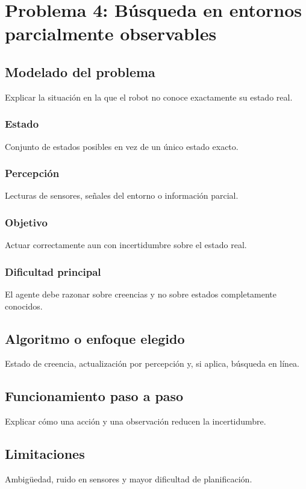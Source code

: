 \section{Problema 4: Búsqueda en entornos parcialmente observables}

\subsection{Modelado del problema}
Explicar la situación en la que el robot no conoce exactamente su estado real.

\subsubsection{Estado}
Conjunto de estados posibles en vez de un único estado exacto.

\subsubsection{Percepción}
Lecturas de sensores, señales del entorno o información parcial.

\subsubsection{Objetivo}
Actuar correctamente aun con incertidumbre sobre el estado real.

\subsubsection{Dificultad principal}
El agente debe razonar sobre creencias y no sobre estados completamente conocidos.

\subsection{Algoritmo o enfoque elegido}
Estado de creencia, actualización por percepción y, si aplica, búsqueda en línea.

\subsection{Funcionamiento paso a paso}
Explicar cómo una acción y una observación reducen la incertidumbre.

\subsection{Limitaciones}
Ambigüedad, ruido en sensores y mayor dificultad de planificación.